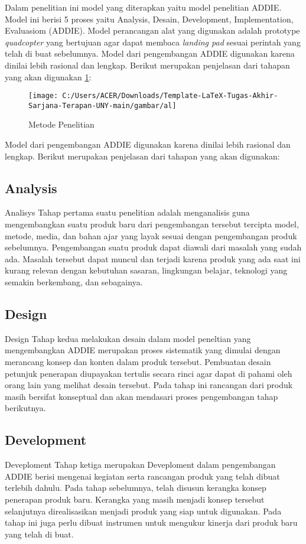Dalam penelitian ini model yang diterapkan yaitu model penelitian ADDIE. Model ini berisi 5 proses yaitu Analysis, Desain, Development, Implementation,
Evaluasiom (ADDIE). Model perancangan alat yang digunakan adalah prototype \textit{quadcopter} yang bertujuan agar dapat membaca \textit{landing pad} sesuai perintah yang telah di buat sebelumnya. Model dari pengembangan ADDIE digunakan karena dinilai lebih rasional dan lengkap\cite{satriawan2023model}. Berikut merupakan penjelasan dari tahapan yang akan digunakan \cref{fig:al}:

\begin{figure}[H]
	\centering
	\texttt{[image: C:/Users/ACER/Downloads/Template-LaTeX-Tugas-Akhir-Sarjana-Terapan-UNY-main/gambar/al]}
	\caption{Metode Penelitian}
	\label{fig:al}
\end{figure}

Model dari pengembangan ADDIE digunakan karena dinilai lebih rasional dan lengkap. Berikut merupakan penjelasan dari tahapan yang akan digunakan:
\subsection{Analysis}
Analisys Tahap pertama suatu penelitian adalah menganalisis guna mengembangkan suatu produk baru dari pengembangan tersebut tercipta model, metode, media, dan bahan ajar yang layak sesuai dengan pengembangan produk sebelumnya. Pengembangan suatu produk dapat diawali dari masalah yang sudah ada. Masalah tersebut dapat muncul dan terjadi karena produk yang ada saat ini kurang relevan dengan kebutuhan sasaran, lingkungan belajar, teknologi yang semakin berkembang, dan sebagainya.
\subsection{Design}
Design Tahap kedua melakukan desain dalam model peneltian yang mengembangkan ADDIE merupakan proses sistematik yang dimulai dengan merancang konsep dan konten dalam produk tersebut. Pembuatan desain petunjuk penerapan diupayakan tertulis secara rinci agar dapat di pahami oleh orang lain yang melihat desain tersebut. Pada tahap ini rancangan dari produk masih bersifat konseptual dan akan mendasari proses pengembangan tahap berikutnya.
\subsection{Development}
Deveploment Tahap ketiga merupakan Deveploment dalam pengembangan ADDIE berisi mengenai kegiatan serta rancangan produk yang telah dibuat terlebih dahulu. Pada tahap sebelumnya, telah disusun kerangka konsep penerapan produk baru. Kerangka yang masih menjadi konsep tersebut selanjutnya direalisasikan menjadi produk yang siap untuk digunakan. Pada tahap ini juga perlu dibuat instrumen untuk mengukur kinerja dari produk baru yang telah di buat.

